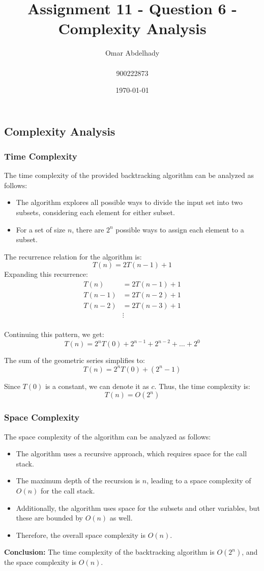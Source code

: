 \documentclass{article}
\title{Assignment 11 - Question 6 - Complexity Analysis}
\author{Omar Abdelhady \\ \\900222873}
\date{\today}
\begin{document}
\maketitle

\newpage

\subsection*{Complexity Analysis}
\subsubsection*{Time Complexity}

The time complexity of the provided backtracking algorithm can be analyzed as follows:

\begin{itemize}
    \item The algorithm explores all possible ways to divide the input set into two subsets, considering each element for either subset.
    \item For a set of size $n$, there are $2^n$ possible ways to assign each element to a subset.
\end{itemize}

The recurrence relation for the algorithm is:
\[
T(n) = 2T(n-1) + 1
\]
Expanding this recurrence:
\begin{align*}
T(n) &= 2T(n-1) + 1 \\
T(n-1) &= 2T(n-2) + 1 \\
T(n-2) &= 2T(n-3) + 1 \\
&\vdots \\
\end{align*}

Continuing this pattern, we get:
\[
T(n) = 2^n T(0) + 2^{n-1} + 2^{n-2} + \ldots + 2^0
\]

The sum of the geometric series simplifies to:
\[
T(n) = 2^n T(0) + (2^n - 1)
\]

Since $T(0)$ is a constant, we can denote it as $c$. Thus, the time complexity is:
\[
T(n) = O(2^n)
\]

\subsubsection*{Space Complexity}
The space complexity of the algorithm can be analyzed as follows:
\begin{itemize}
    \item The algorithm uses a recursive approach, which requires space for the call stack.
    \item The maximum depth of the recursion is $n$, leading to a space complexity of $O(n)$ for the call stack.
    \item Additionally, the algorithm uses space for the subsets and other variables, but these are bounded by $O(n)$ as well.
    \item Therefore, the overall space complexity is $O(n)$.
\end{itemize}

\textbf{Conclusion:} The time complexity of the backtracking algorithm is $O(2^n)$, and the space complexity is $O(n)$.
\end{document}

